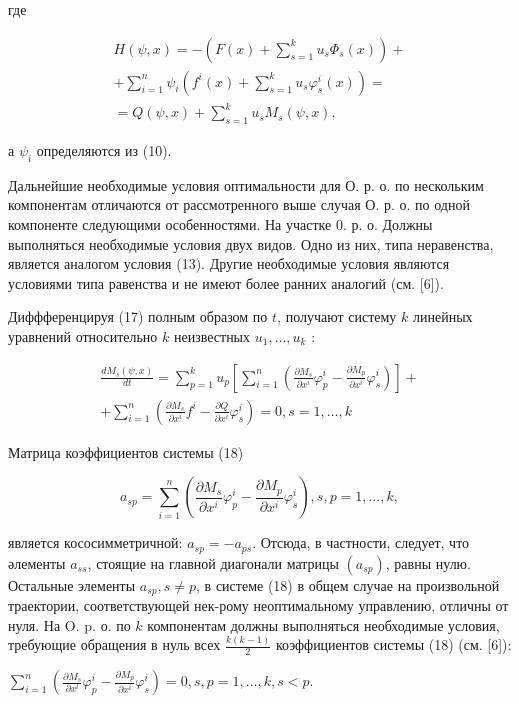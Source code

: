\documentclass[10pt]{article}
\begin{document}
где

\[
\begin{gathered}
H(\psi, x)=-\left(F(x)+\sum_{s=1}^{k} u_{s} \Phi_{s}(x)\right)+ \\
+\sum_{i=1}^{n} \psi_{i}\left(f^{i}(x)+\sum_{s=1}^{k} u_{s} \varphi_{s}^{i}(x)\right)= \\
=Q(\psi, x)+\sum_{s=1}^{k} u_{s} M_{s}(\psi, x),
\end{gathered}
\]

а $\psi_{i}$ определяются из (10).

Дальнейшие необходимые условия оптимальности для О. р. о. по нескольким компонентам отличаются от рассмотренного выше случая О. р. о. по одной компоненте следующими особенностями. На участке 0. р. о. Должны выполняться необходимые условия двух видов. Одно из них, типа неравенства, является аналогом условия (13). Другие необходимые условия являются условиями типа равенства и не имеют более ранних аналогий (см. [6]).

Диффференцируя (17) полным образом по $t$, получают систему $k$ линейных уравнений относительно $k$ неизвестных $u_{1}, \ldots, u_{k}$ :

\[
\begin{gathered}
\frac{d M_{s}(\psi, x)}{d t}=\sum_{p=1}^{k} u_{p}\left[\sum_{i=1}^{n}\left(\frac{\partial M_{s}}{\partial x^{i}} \varphi_{p}^{i}-\frac{\partial M_{p}}{\partial x^{i}} \varphi_{s}^{i}\right)\right]+ \\
+\sum_{i=1}^{n}\left(\frac{\partial M_{s}}{\partial x^{i}} f^{i}-\frac{\partial Q}{\partial x^{i}} \varphi_{s}^{i}\right)=0, s=1, \ldots, k
\end{gathered}
\]

Матрица коэффициентов системы (18)

\[
a_{s p}=\sum_{i=1}^{n}\left(\frac{\partial M_{s}}{\partial x^{i}} \varphi_{p}^{i}-\frac{\partial M_{p}}{\partial x^{i}} \varphi_{s}^{i}\right), s, p=1, \ldots, k,
\]

является кососимметричной: $a_{s p}=-a_{p s}$. Отсюда, в частности, следует, что әлементы $a_{s s}$, стоящие на главной диагонали матрицы $\left(a_{s p}\right)$, равны нулю. Остальные элементы $a_{s p}, s \neq p$, в системе (18) в общем случае на произвольной траектории, соответствующей нек-рому неоптимальному управлению, отличны от нуля. На O. p. о. по $k$ компонентам должны выполняться необходимые условия, требующие обращения в нуль всех $\frac{k(k-1)}{2}$ коэффициентов системы (18) (см. [6]):

$\sum_{i=1}^{n}\left(\frac{\partial M_{s}}{\partial x^{l}} \varphi_{p}^{i}-\frac{\partial M_{p}}{\partial x^{i}} \varphi_{s}^{i}\right)=0, s, p=1, \ldots, k, s<p$.
\end{document}
